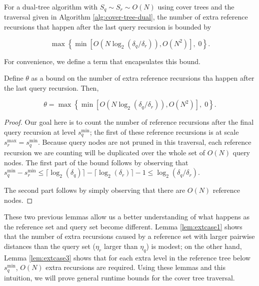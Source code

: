 \begin{lemma}
\label{lem:extcase3}
For a dual-tree algorithm with $S_q \sim S_r \sim O(N)$ using cover trees and
the traversal given in Algorithm \ref{alg:cover-tree-dual}, the number of extra
reference recursions that happen after the last query recursion is bounded by

\begin{equation}
\max\left\{\min\left[O(N \log_2(\delta_q / \delta_r)),
O(N^2)\right], \; 0\right\}.
\end{equation}
\end{lemma}

For convenience, we define a term that encapsulates this bound.

\begin{defn}
Define $\theta$ as a bound on the number of extra reference recursions tha
happen after the last query recursion.  Then,

\begin{equation}
\theta = \max\left\{\min\left[O(N \log_2(\delta_q / \delta_r)), O(N^2)\right],
\; 0\right\}.
\end{equation}
\end{defn}

\begin{proof}
Our goal here is to count the number of reference recursions after the final
query recursion at level $s_q^{\min}$; the first of these reference recursions
is at scale $s_r^{\max} = s_q^{\min}$.  Because query nodes are not pruned in
this traversal, each reference recursion we are counting will be duplicated over
the whole set of $O(N)$ query nodes.  The first part of the bound follows by
observing that
$s_q^{\min} - s_r^{\min} \le \lceil \log_2(\delta_q) \rceil -
\lceil \log_2(\delta_r) \rceil - 1 \le \log_2(\delta_q / \delta_r)$.

The second part follows by simply observing that there are $O(N)$ reference
nodes.
\end{proof}

These two previous lemmas allow us a better understanding of what happens as the
reference set and query set become different.  Lemma \ref{lem:extcase1} shows
that the number of extra recursions caused by a reference set with larger
pairwise distances than the query set ($\eta_r$ larger than $\eta_q$) is modest;
on the other hand, Lemma \ref{lem:extcase3} shows that for each extra level in
the reference tree below $s_q^{\min}$, $O(N)$ extra recursions are required.
Using these lemmas and this intuition, we will prove general runtime bounds for
the cover tree traversal.

